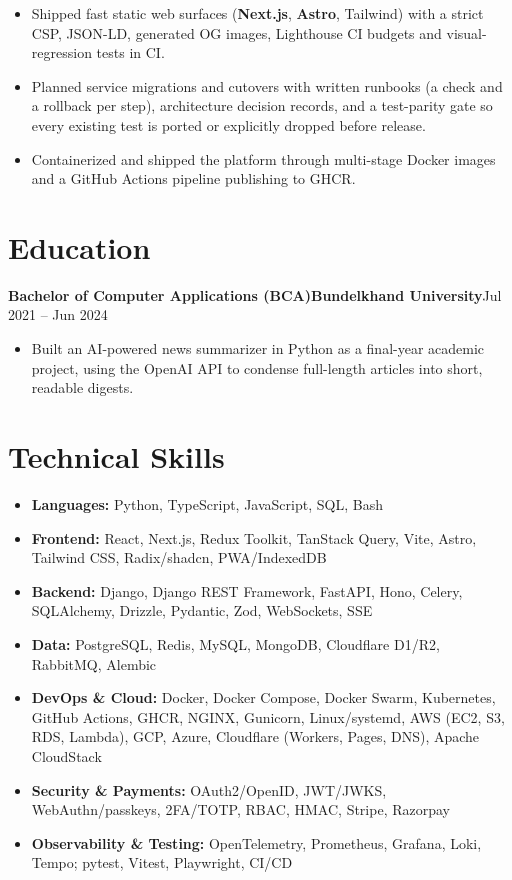 \documentclass[11pt,a4paper]{article}
\newcommand{\entry}[3]{%
  \vspace{4.5pt}\noindent\textbf{#1}\hfill\textbf{#2}\hfill{\color{subtlegray}#3}\par\vspace{2pt}}
\begin{document}
\begin{itemize}
        patterns with TanStack Query and an IndexedDB outbox that replays writes
        on reconnect, tested with Vitest and \textbf{Playwright} end-to-end suites.
  \item Shipped fast static web surfaces (\textbf{Next.js}, \textbf{Astro},
        Tailwind) with a strict CSP, JSON-LD, generated OG images, Lighthouse CI
        budgets and visual-regression tests in CI.
  \item Planned service migrations and cutovers with written runbooks (a check
        and a rollback per step), architecture decision records, and a test-parity
        gate so every existing test is ported or explicitly dropped before release.
  \item Containerized and shipped the platform through multi-stage Docker images
        and a GitHub Actions pipeline publishing to GHCR.
\end{itemize}

\section{Education}
\entry{Bachelor of Computer Applications (BCA)}{Bundelkhand University}{Jul 2021 -- Jun 2024}
\begin{itemize}
  \item Built an AI-powered news summarizer in Python as a final-year academic
        project, using the OpenAI API to condense full-length articles into short,
        readable digests.
\end{itemize}

\section{Technical Skills}
\begin{itemize}
  \item \textbf{Languages:} Python, TypeScript, JavaScript, SQL, Bash
  \item \textbf{Frontend:} React, Next.js, Redux Toolkit, TanStack Query, Vite, Astro, Tailwind CSS, Radix/shadcn, PWA/IndexedDB
  \item \textbf{Backend:} Django, Django REST Framework, FastAPI, Hono, Celery, SQLAlchemy, Drizzle, Pydantic, Zod, WebSockets, SSE
  \item \textbf{Data:} PostgreSQL, Redis, MySQL, MongoDB, Cloudflare D1/R2, RabbitMQ, Alembic
  \item \textbf{DevOps \& Cloud:} Docker, Docker Compose, Docker Swarm, Kubernetes, GitHub Actions, GHCR, NGINX, Gunicorn, Linux/systemd, AWS (EC2, S3, RDS, Lambda), GCP, Azure, Cloudflare (Workers, Pages, DNS), Apache CloudStack
  \item \textbf{Security \& Payments:} OAuth2/OpenID, JWT/JWKS, WebAuthn/passkeys, 2FA/TOTP, RBAC, HMAC, Stripe, Razorpay
  \item \textbf{Observability \& Testing:} OpenTelemetry, Prometheus, Grafana, Loki, Tempo; pytest, Vitest, Playwright, CI/CD
\end{itemize}
\end{document}
